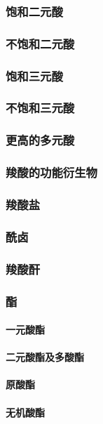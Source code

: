 \documentclass[UTF8]{../03-Chemistry}
\begin{document}
        \subsubsection{饱和二元酸}
        \subsubsection{不饱和二元酸}
        \subsubsection{饱和三元酸}
        \subsubsection{不饱和三元酸}
        \subsubsection{更高的多元酸}
    \subsubsection{羧酸的功能衍生物}
        \subsubsection{羧酸盐}
        \subsubsection{酰卤}
        \subsubsection{羧酸酐}
        \subsubsection{酯}
            \paragraph{一元酸酯}
            \paragraph{二元酸酯及多酸酯}
            \paragraph{原酸酯}
            \paragraph{无机酸酯}
\end{document}
